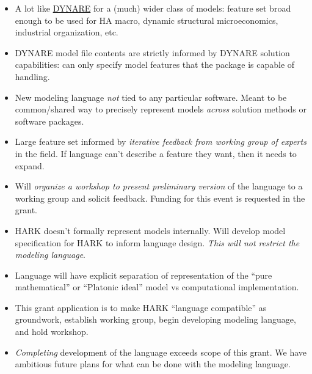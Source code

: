 \documentclass[12pt,pdftex,letterpaper]{article}
\begin{document}
\begin{itemize}
	\item A lot like \href{https://www.dynare.org/}{DYNARE} for a (much) wider class of models: feature set broad enough to be used for HA macro, dynamic structural microeconomics, industrial organization, etc.
	
	\item DYNARE model file contents are strictly informed by DYNARE solution capabilities: can only specify model features that the package is capable of handling.
	
	\item New modeling language \textit{not} tied to any particular software. Meant to be common/shared way to precisely represent models \textit{across} solution methods or software packages.
	
	\item Large feature set informed by \emph{iterative feedback from working group of experts} in the field. If language can't describe a feature they want, then it needs to expand.
	
	\item Will \emph{organize a workshop to present preliminary version} of the language to a working group and solicit feedback. Funding for this event is requested in the grant.
	
	\item HARK doesn't formally represent models internally. Will develop model specification for HARK to inform language design. \emph{This will not restrict the modeling language}.
	
	\item Language will have explicit separation of representation of the ``pure mathematical'' or ``Platonic ideal'' model vs computational implementation.%
	
	\item This grant application is to make HARK ``language compatible'' as groundwork, establish working group, begin developing modeling language, and hold workshop.
	
	\item \emph{Completing} development of the language exceeds scope of this grant. We have ambitious future plans for what can be done with the modeling language.
	
	

\end{itemize}
\end{document}
